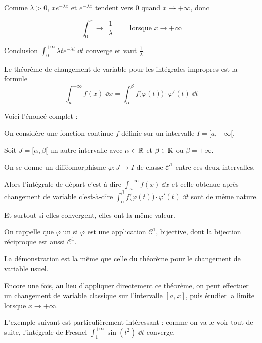 \change
Comme $\lambda >0$, 
 $xe^{-\lambda x}$ et $e^{-\lambda x}$ 
tendent vers $0$ quand $x \to +\infty $, donc 

$$\int_0^{x}  \longrightarrow \ \  \frac{1}{\lambda} \qquad \text{ lorsque } x \to +\infty $$

\change
Conclusion $\int_0^{+\infty} \lambda t e^{-\lambda t}\;\dd t$
converge et vaut $\frac{1}{\lambda}$.



\diapo

Le théorème de changement de variable pour les intégrales impropres 
est la formule 
$$\int_{a}^{+\infty} f(x) \;\dd x 
= \int_\alpha^\beta f\big(\varphi(t)\big)\cdot\varphi'(t) \;\dd t$$

\change
Voici l'énoncé complet :

On considère une fonction continue $f$ définie sur un intervalle 
$I = [a,+\infty[$. 

Soit $J= [\alpha,\beta[$ un autre intervalle avec 
$\alpha\in \mathbb{R}$ et $\beta\in \mathbb{R}$ ou $\beta=+\infty$. 

On se donne  un difféomorphisme $\varphi : J \to I$ de classe $\mathcal{C}^1$ entre ces deux intervalles.

Alors l'intégrale de départ 
c'est-à-dire $\int_{a}^{+\infty} f(x) \;\dd x$ 
et celle obtenue après changement de variable 
c'est-à-dire 
$\int_\alpha^\beta f\big(\varphi(t)\big)\cdot\varphi'(t) \;\dd t$ 
sont de même nature.

Et surtout si elles convergent, elles ont la même valeur.

\change
On rappelle que $\varphi$ un 
si $\varphi$ est une application $\mathcal{C}^1$, bijective, dont la bijection réciproque est
aussi $\mathcal{C}^1$.

La démonstration est la même que celle du théorème 
pour le changement de variable usuel.

Encore une fois, au lieu d'appliquer directement ce théorème, 
on peut effectuer un changement de variable classique sur l'intervalle $[a,x]$,
puis étudier la limite lorsque $x\to +\infty$.



\diapo

L'exemple suivant est particulièrement intéressant : 
comme on va le voir tout de suite, l'intégrale de Fresnel  
$\int_1^{+\infty} \sin (t^2) \; \dd t$ converge.

